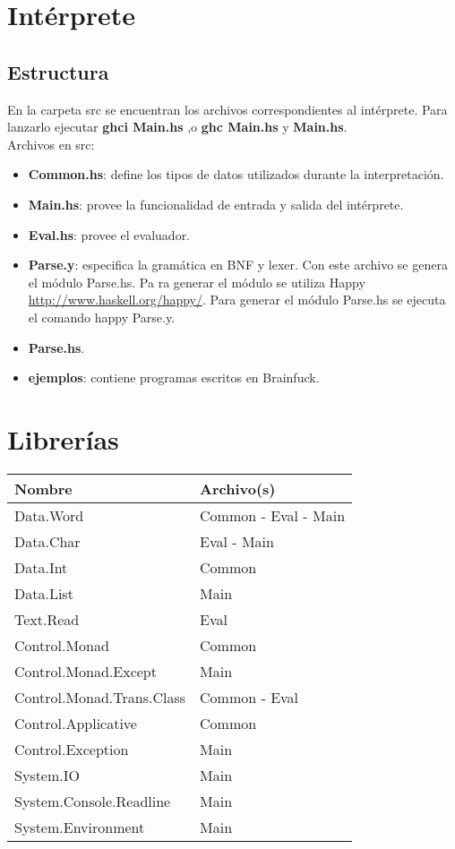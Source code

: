 \documentclass[a4paper, 12pt]{article}
\begin{document}
\section*{Intérprete}
\subsection*{Estructura}

En la carpeta src se encuentran los archivos correspondientes al intérprete. Para lanzarlo
ejecutar \textbf{ghci Main.hs} ,o \textbf{ghc Main.hs} y  \textbf{Main.hs}. \\
Archivos en src:
\begin{itemize}
	\item \textbf{Common.hs}: define los tipos de datos utilizados durante la interpretación.
	\item \textbf{Main.hs}: provee la funcionalidad de entrada y salida del intérprete.
	\item \textbf{Eval.hs}: provee el evaluador.
	\item \textbf{Parse.y}: especifica la gramática en BNF y lexer. Con este archivo se genera el módulo Parse.hs. Pa
	ra generar el módulo se utiliza Happy \url{http://www.haskell.org/happy/}. Para generar el módulo Parse.hs
	se ejecuta el comando happy Parse.y.
	\item \textbf{Parse.hs}.
	\item \textbf{ejemplos}: contiene programas escritos en Brainfuck.
\end{itemize}




\section*{Librerías}


\begin{center}
\begin{tabular}{ |l|l| } 
 \hline
 Nombre & Archivo(s) \\
 \hline
 Data.Word & Common - Eval - Main \\
 Data.Char & Eval - Main \\
 Data.Int & Common \\
 Data.List & Main \\
 Text.Read & Eval \\
 Control.Monad & Common \\
 Control.Monad.Except & Main \\ 
 Control.Monad.Trans.Class & Common - Eval \\
 Control.Applicative & Common \\
 Control.Exception & Main \\ 
 System.IO & Main \\ 
 System.Console.Readline & Main \\ 
 System.Environment & Main \\ 
 \hline
\end{tabular}
\end{center}

\newpage
\nocite{*}
\printbibliography[title={Referencias}]
\end{document}
